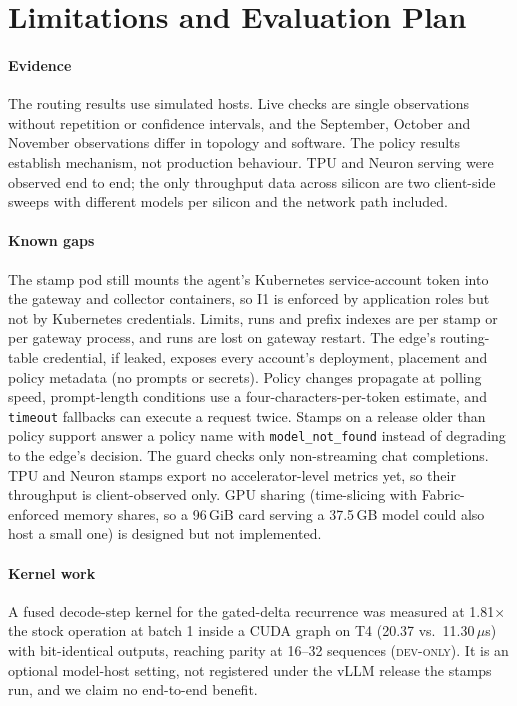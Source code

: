 \documentclass[conference,letterpaper]{IEEEtran}
\newcommand{\sys}{Fabric}
\newcommand{\code}[1]{\texttt{\small #1}}
\newcommand{\ev}[1]{{\normalfont\textsc{#1}}}
\newcommand{\DevOnly}{\ev{dev-only}}
\begin{document}
\section{Limitations and Evaluation Plan}
\label{sec:limits}

\paragraph*{Evidence}
The routing results use simulated hosts. Live checks are single observations without
repetition or confidence intervals, and the September, October and November observations
differ in topology and software. The policy results establish mechanism, not production
behaviour. TPU and Neuron serving were observed end to end; the only throughput data across
silicon are two client-side sweeps with different models per silicon and the network
path included.

\paragraph*{Known gaps}
The stamp pod still mounts the agent's Kubernetes service-account token into the gateway and
collector containers, so I1 is enforced by application roles but not by Kubernetes credentials.
Limits, runs and prefix indexes are per stamp or per gateway process, and runs are lost on
gateway restart. The
edge's routing-table credential, if leaked, exposes every account's deployment, placement and
policy metadata (no prompts or secrets). Policy changes propagate at polling speed, prompt-length
conditions use a four-characters-per-token estimate, and \code{timeout} fallbacks can execute a
request twice. Stamps on a release older than policy support answer a policy name with
\code{model\_not\_found} instead of degrading to the edge's decision. The guard checks only non-streaming chat completions. TPU and Neuron stamps export no
accelerator-level metrics yet, so their throughput is client-observed only. GPU sharing (time-slicing with
\sys{}-enforced memory shares, so a 96\,GiB card serving a 37.5\,GB model could also host a
small one) is designed but not implemented.

\paragraph*{Kernel work}
A fused decode-step kernel for the gated-delta recurrence was measured at 1.81$\times$ the stock
operation at batch 1 inside a CUDA graph on T4 (20.37 vs.\ 11.30\,$\mu$s) with bit-identical
outputs, reaching parity at 16--32 sequences (\DevOnly{}). It is an optional model-host setting,
not registered under the vLLM release the stamps run, and we claim no end-to-end benefit.
\end{document}
